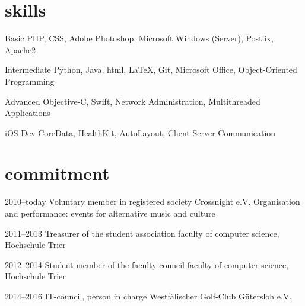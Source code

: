 \documentclass[]{friggeri-cv} %
\begin{document}

\section{skills}

\begin{entrylist}


\entry
{Basic}
{PHP, CSS, Adobe Photoshop, Microsoft Windows (Server), Postfix, Apache2}
{}

\entry
{Intermediate}
{Python, Java, html, LaTeX, Git, Microsoft Office, Object-Oriented Programming}
{}

\entry
{Advanced}
{Objective-C, Swift, Network Administration, Multithreaded Applications}
{}

\entry
{iOS Dev}
{CoreData, HealthKit, AutoLayout, Client-Server Communication}
{}
\\
\end{entrylist}

\newpage

\section{commitment}

\begin{entrylist}


\entry
{2010--today}
{Voluntary member in registered society Crossnight e.V.}
{}
{Organisation and performance: events for alternative music and culture}


\entry
{2011--2013}
{Treasurer of the student association}
{}
{faculty of computer science, Hochschule Trier}


\entry
{2012--2014}
{Student member of the faculty council}
{}
{faculty of computer science, Hochschule Trier}


\entry
{2014--2016}
{IT-council, person in charge}
{}
{Westf\"{a}lischer Golf-Club G\"{u}tersloh e.V.}

\\
\end{entrylist}
\end{document}
